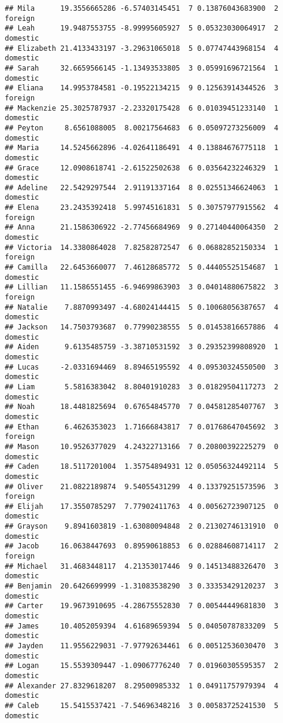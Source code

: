 \documentclass[
]{article}
\begin{document}
\begin{verbatim}
## Mila      19.3556665286 -6.57403145451  7 0.13876043683900  2  foreign
## Leah      19.9487553755 -8.99995605927  5 0.05323030064917  2 domestic
## Elizabeth 21.4133433197 -3.29631065018  5 0.07747443968154  4 domestic
## Sarah     32.6659566145 -1.13493533805  3 0.05991696721564  1 domestic
## Eliana    14.9953784581 -0.19522134215  9 0.12563914344526  3  foreign
## Mackenzie 25.3025787937 -2.23320175428  6 0.01039451233140  1 domestic
## Peyton     8.6561088005  8.00217564683  6 0.05097273256009  4 domestic
## Maria     14.5245662896 -4.02641186491  4 0.13884676775118  1 domestic
## Grace     12.0908618741 -2.61522502638  6 0.03564232246329  1 domestic
## Adeline   22.5429297544  2.91191337164  8 0.02551346624063  1 domestic
## Elena     23.2435392418  5.99745161831  5 0.30757977915562  4  foreign
## Anna      21.1586306922 -2.77456684969  9 0.27140440064350  2 domestic
## Victoria  14.3380864028  7.82582872547  6 0.06882852150334  1  foreign
## Camilla   22.6453660077  7.46128685772  5 0.44405525154687  1 domestic
## Lillian   11.1586551455 -6.94699863903  3 0.04014880675822  3  foreign
## Natalie    7.8870993497 -4.68024144415  5 0.10068056387657  4 domestic
## Jackson   14.7503793687  0.77990238555  5 0.01453816657886  4 domestic
## Aiden      9.6135485759 -3.38710531592  3 0.29352399808920  1 domestic
## Lucas     -2.0331694469  8.89465195592  4 0.09530324550500  3 domestic
## Liam       5.5816383042  8.80401910283  3 0.01829504117273  2 domestic
## Noah      18.4481825694  0.67654845770  7 0.04581285407767  3 domestic
## Ethan      6.4626353023  1.71666843817  7 0.01768647045692  3  foreign
## Mason     10.9526377029  4.24322713166  7 0.20800392225279  0 domestic
## Caden     18.5117201004  1.35754894931 12 0.05056324492114  5 domestic
## Oliver    21.0822189874  9.54055431299  4 0.13379251573596  3  foreign
## Elijah    17.3550785297  7.77902411763  4 0.00562723907125  0 domestic
## Grayson    9.8941603819 -1.63080094848  2 0.21302746131910  0 domestic
## Jacob     16.0638447693  0.89590618853  6 0.02884608714117  2  foreign
## Michael   31.4683448117  4.21353017446  9 0.14513488326470  3 domestic
## Benjamin  20.6426699999 -1.31083538290  3 0.33353429120237  3 domestic
## Carter    19.9673910695 -4.28675552830  7 0.00544449681830  3 domestic
## James     10.4052059394  4.61689659394  5 0.04050787833209  5 domestic
## Jayden    11.9556229031 -7.97792634461  6 0.00512536030470  3 domestic
## Logan     15.5539309447 -1.09067776240  7 0.01960305595357  2 domestic
## Alexander 27.8329618207  8.29500985332  1 0.04911757979394  4 domestic
## Caleb     15.5415537421 -7.54696348216  3 0.00583725241530  5 domestic

\end{verbatim}
\end{document}
